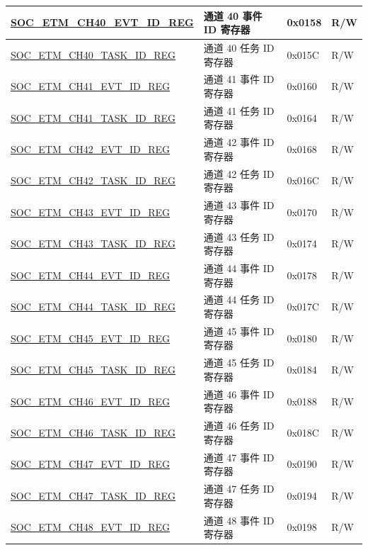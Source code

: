 \begin{longtable}{ | p{6cm} | p{6.4cm} | p{1.3cm} | p{1.8cm} | }
\hyperref[regdesc:SOCETMCH0EVTIDREG]{SOC\_ETM\_CH40\_EVT\_ID\_REG} & 通道 40 事件 ID 寄存器 & 0x0158 & R/W \\ \hline
\hyperref[regdesc:SOCETMCH0TASKIDREG]{SOC\_ETM\_CH40\_TASK\_ID\_REG} & 通道 40 任务 ID 寄存器 & 0x015C & R/W \\ \hline
\hyperref[regdesc:SOCETMCH0EVTIDREG]{SOC\_ETM\_CH41\_EVT\_ID\_REG} & 通道 41 事件 ID 寄存器 & 0x0160 & R/W \\ \hline
\hyperref[regdesc:SOCETMCH0TASKIDREG]{SOC\_ETM\_CH41\_TASK\_ID\_REG} & 通道 41 任务 ID 寄存器 & 0x0164 & R/W \\ \hline
\hyperref[regdesc:SOCETMCH0EVTIDREG]{SOC\_ETM\_CH42\_EVT\_ID\_REG} & 通道 42 事件 ID 寄存器 & 0x0168 & R/W \\ \hline
\hyperref[regdesc:SOCETMCH0TASKIDREG]{SOC\_ETM\_CH42\_TASK\_ID\_REG} & 通道 42 任务 ID 寄存器 & 0x016C & R/W \\ \hline
\hyperref[regdesc:SOCETMCH0EVTIDREG]{SOC\_ETM\_CH43\_EVT\_ID\_REG} & 通道 43 事件 ID 寄存器 & 0x0170 & R/W \\ \hline
\hyperref[regdesc:SOCETMCH0TASKIDREG]{SOC\_ETM\_CH43\_TASK\_ID\_REG} & 通道 43 任务 ID 寄存器 & 0x0174 & R/W \\ \hline
\hyperref[regdesc:SOCETMCH0EVTIDREG]{SOC\_ETM\_CH44\_EVT\_ID\_REG} & 通道 44 事件 ID 寄存器 & 0x0178 & R/W \\ \hline
\hyperref[regdesc:SOCETMCH0TASKIDREG]{SOC\_ETM\_CH44\_TASK\_ID\_REG} & 通道 44 任务 ID 寄存器 & 0x017C & R/W \\ \hline
\hyperref[regdesc:SOCETMCH0EVTIDREG]{SOC\_ETM\_CH45\_EVT\_ID\_REG} & 通道 45 事件 ID 寄存器 & 0x0180 & R/W \\ \hline
\hyperref[regdesc:SOCETMCH0TASKIDREG]{SOC\_ETM\_CH45\_TASK\_ID\_REG} & 通道 45 任务 ID 寄存器 & 0x0184 & R/W \\ \hline
\hyperref[regdesc:SOCETMCH0EVTIDREG]{SOC\_ETM\_CH46\_EVT\_ID\_REG} & 通道 46 事件 ID 寄存器 & 0x0188 & R/W \\ \hline
\hyperref[regdesc:SOCETMCH0TASKIDREG]{SOC\_ETM\_CH46\_TASK\_ID\_REG} & 通道 46 任务 ID 寄存器 & 0x018C & R/W \\ \hline
\hyperref[regdesc:SOCETMCH0EVTIDREG]{SOC\_ETM\_CH47\_EVT\_ID\_REG} & 通道 47 事件 ID 寄存器 & 0x0190 & R/W \\ \hline
\hyperref[regdesc:SOCETMCH0TASKIDREG]{SOC\_ETM\_CH47\_TASK\_ID\_REG} & 通道 47 任务 ID 寄存器 & 0x0194 & R/W \\ \hline
\hyperref[regdesc:SOCETMCH0EVTIDREG]{SOC\_ETM\_CH48\_EVT\_ID\_REG} & 通道 48 事件 ID 寄存器 & 0x0198 & R/W \\ \hline

\end{longtable}
